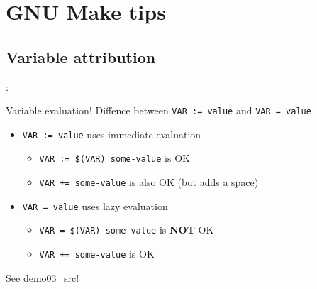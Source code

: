 \section{GNU Make tips}

\subsection{Variable attribution}
\begin{frame}{\secname: \small\subsecname\normalsize}
    \begin{block}{Variable evaluation!}
        Diffence between \texttt{VAR := value} and \texttt{VAR = value}
    \end{block}

    \begin{itemize}
        \item \texttt{VAR := value} uses immediate evaluation
        \begin{itemize}
            \item \texttt{VAR := \$(VAR) some-value} is OK
            \item \texttt{VAR += some-value} is also OK (but adds a space)
        \end{itemize}
        \item \texttt{VAR = value} uses lazy evaluation
        \begin{itemize}
            \item \texttt{VAR = \$(VAR) some-value} is \textbf{NOT} OK
            \item \texttt{VAR += some-value} is OK
        \end{itemize}
    \end{itemize}

    See demo03_src!
\end{frame}
